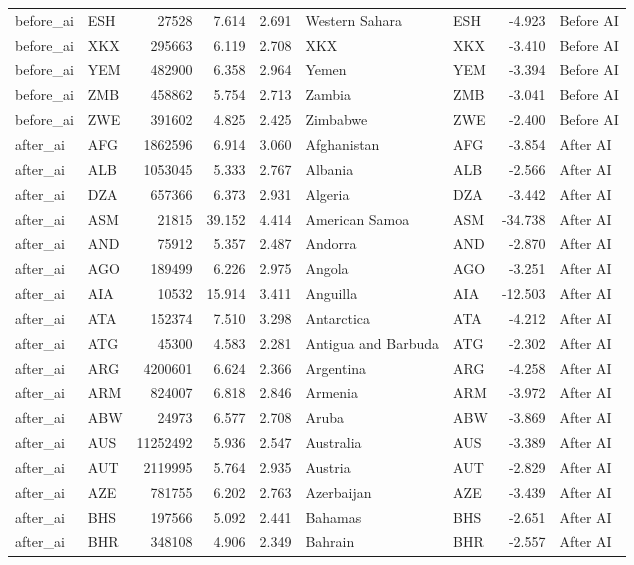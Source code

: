 \begin{tabular}{llrrrllrl}
before\_ai & ESH & 27528 & 7.614 & 2.691 & Western Sahara & ESH & -4.923 & Before AI \\
before\_ai & XKX & 295663 & 6.119 & 2.708 & XKX & XKX & -3.410 & Before AI \\
before\_ai & YEM & 482900 & 6.358 & 2.964 & Yemen & YEM & -3.394 & Before AI \\
before\_ai & ZMB & 458862 & 5.754 & 2.713 & Zambia & ZMB & -3.041 & Before AI \\
before\_ai & ZWE & 391602 & 4.825 & 2.425 & Zimbabwe & ZWE & -2.400 & Before AI \\
after\_ai & AFG & 1862596 & 6.914 & 3.060 & Afghanistan & AFG & -3.854 & After AI \\
after\_ai & ALB & 1053045 & 5.333 & 2.767 & Albania & ALB & -2.566 & After AI \\
after\_ai & DZA & 657366 & 6.373 & 2.931 & Algeria & DZA & -3.442 & After AI \\
after\_ai & ASM & 21815 & 39.152 & 4.414 & American Samoa & ASM & -34.738 & After AI \\
after\_ai & AND & 75912 & 5.357 & 2.487 & Andorra & AND & -2.870 & After AI \\
after\_ai & AGO & 189499 & 6.226 & 2.975 & Angola & AGO & -3.251 & After AI \\
after\_ai & AIA & 10532 & 15.914 & 3.411 & Anguilla & AIA & -12.503 & After AI \\
after\_ai & ATA & 152374 & 7.510 & 3.298 & Antarctica & ATA & -4.212 & After AI \\
after\_ai & ATG & 45300 & 4.583 & 2.281 & Antigua and Barbuda & ATG & -2.302 & After AI \\
after\_ai & ARG & 4200601 & 6.624 & 2.366 & Argentina & ARG & -4.258 & After AI \\
after\_ai & ARM & 824007 & 6.818 & 2.846 & Armenia & ARM & -3.972 & After AI \\
after\_ai & ABW & 24973 & 6.577 & 2.708 & Aruba & ABW & -3.869 & After AI \\
after\_ai & AUS & 11252492 & 5.936 & 2.547 & Australia & AUS & -3.389 & After AI \\
after\_ai & AUT & 2119995 & 5.764 & 2.935 & Austria & AUT & -2.829 & After AI \\
after\_ai & AZE & 781755 & 6.202 & 2.763 & Azerbaijan & AZE & -3.439 & After AI \\
after\_ai & BHS & 197566 & 5.092 & 2.441 & Bahamas & BHS & -2.651 & After AI \\
after\_ai & BHR & 348108 & 4.906 & 2.349 & Bahrain & BHR & -2.557 & After AI \\

\end{tabular}
